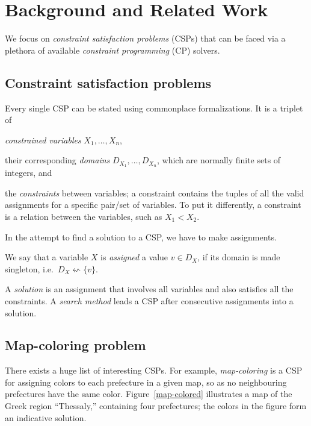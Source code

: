\documentclass{ws-ijait}
\begin{document}
\section{Background and Related Work}

We focus on \emph{constraint satisfaction problems}
(CSPs)\cite{CSP} that can be faced via a plethora of
available \emph{constraint programming} (CP)
solvers.\cite{eclipse,ilog}

\subsection{Constraint satisfaction problems}

Every single CSP can be stated using commonplace
formalizations. It is a triplet of
\begin{romanlist}
  \item \emph{constrained variables} $X_1, \ldots, X_n$,
  \item their corresponding \emph{domains} $D_{X_1}, \ldots,
        D_{X_n}$, which are normally finite sets of
        integers, and
  \item the \emph{constraints} between variables; a
        constraint contains the tuples of all the valid
        assignments for a specific pair\slash set of
        variables. To put it differently, a constraint is a
        relation between the variables, such as $X_1 < X_2$.
\end{romanlist}
In the attempt to find a solution to a CSP, we have to make
assignments.
\begin{definition}
  We say that a variable $X$ is \emph{assigned} a value $v
  \in D_X$, if its domain is made singleton, i.e.\ $D_X
  \leftsquigarrow \{v\}$.
\end{definition}
A \emph{solution} is an assignment that involves all
variables and also satisfies all the constraints. A
\emph{search method} leads a CSP after consecutive
assignments into a solution.

\subsection{Map-coloring problem}

There exists a huge list of interesting CSPs.\cite{CSPLib}
For example, \emph{map-coloring} is a CSP for assigning
colors to each prefecture in a given map, so as no
neighbouring prefectures have the same color.
Figure~\ref{map-colored} illustrates a map of the Greek
region ``Thessaly,'' containing four prefectures; the colors
in the figure form an indicative solution.
\end{document}
